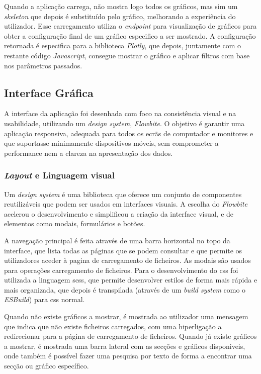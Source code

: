 Quando a aplicação carrega, não mostra logo todos os gráficos, mas sim um \textit{skeleton} que depois é substituído pelo gráfico, melhorando a experiência do utilizador. Esse carregamento utiliza o \textit{endpoint} para visualização de gráficos para obter a configuração final de um gráfico especifico a ser mostrado. A configuração retornada é especifica para a biblioteca \textit{Plotly}, que depois, juntamente com o restante código \textit{Javascript}, consegue mostrar o gráfico e aplicar filtros com base nos parâmetros passados.

\subsection{Interface Gráfica}

A interface da aplicação foi desenhada com foco na consistência visual e na usabilidade, utilizando um \textit{design system}, \textit{Flowbite}. O objetivo é garantir uma aplicação responsiva, adequada para todos os ecrãs de computador e monitores e que suportasse minimamente dispositivos móveis, sem comprometer a performance nem a clareza na apresentação dos dados.

\subsubsection{\textit{Layout} e Linguagem visual}

Um \textit{design system} é uma biblioteca que oferece um conjunto de componentes reutilizáveis que podem ser usados em interfaces visuais. A escolha do \textit{Flowbite} acelerou o desenvolvimento e simplificou a criação da interface visual, e de elementos como modais, formulários e botões. 

A navegação principal é feita através de uma barra horizontal no topo da interface, que lista todas as páginas que se podem consultar e que permite os utilizadores aceder à pagina de carregamento de ficheiros. As modais são usados para operações carregamento de ficheiros. Para o desenvolvimento do \gls{css} foi utilizada a linguagem \gls{scss}, que permite desenvolver estilos de forma mais rápida e mais organizada, que depois é transpilada (através de um \textit{build system} como o \textit{ESBuild}\cite{esbuild}) para \gls{css} normal.

Quando não existe gráficos a mostrar, é mostrada ao utilizador uma mensagem que indica que não existe ficheiros carregados, com uma hiperligação a redirecionar para a página de carregamento de ficheiros. Quando já existe gráficos a mostrar, é mostrada uma barra lateral com as secções e gráficos disponiveis, onde também é possível fazer uma pesquisa por texto de forma a encontrar uma secção ou gráfico específico.

